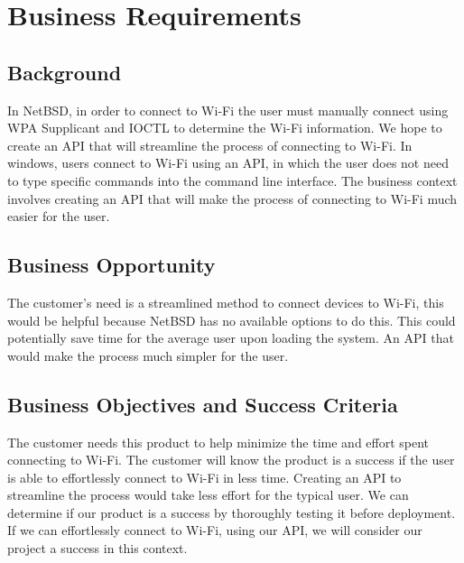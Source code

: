 \section{Business Requirements}
\subsection{Background}

In NetBSD, in order to connect to Wi-Fi the user must manually connect using WPA Supplicant and IOCTL to determine the Wi-Fi information. 
We hope to create an API that will streamline the process of connecting to Wi-Fi. In windows, users connect to Wi-Fi using an API, in which 
the user does not need to type specific commands into the command line interface. The business context involves creating an API that will make 
the process of connecting to Wi-Fi much easier for the user. 

\subsection{Business Opportunity}

The customer’s need is a streamlined method to connect devices to Wi-Fi, this would be helpful because NetBSD has no available options to do this. 
This could potentially save time for the average user upon loading the system. An API that would make the process much simpler for the user. 

\subsection{Business Objectives and Success Criteria}

The customer needs this product to help minimize the time and effort spent connecting to Wi-Fi. The customer will know the product is a success if 
the user is able to effortlessly connect to Wi-Fi in less time. Creating an API to streamline the process would take less effort for the typical user. 
We can determine if our product is a success by thoroughly testing it before deployment. If we can effortlessly connect to Wi-Fi, using our API, we will 
consider our project a success in this context. 

